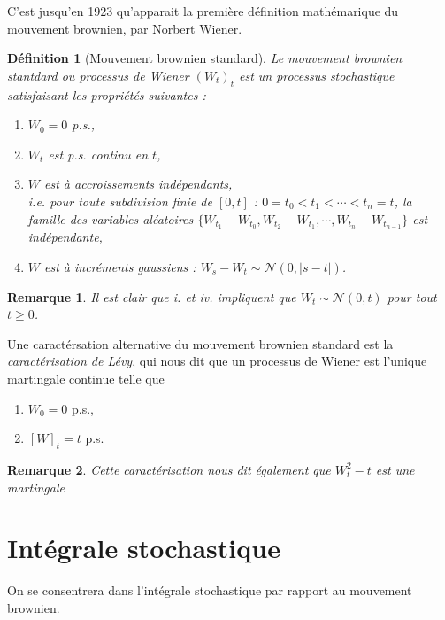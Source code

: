 \documentclass[openany]{book}
\newcommand{\1}{\mathbbm{1}}
\theoremstyle{thmfont}
\theoremstyle{deffont}
\newtheorem{definition}[definition]{Définition}
\theoremstyle{thmfont}
\theoremstyle{deffont}
\newtheorem*{remark}{Remarque}
\begin{document}
C'est jusqu'en 1923 qu'apparait la première définition mathémarique du mouvement brownien, par Norbert Wiener.\\

\begin{definition}[Mouvement brownien standard]  \label{def:MvtBorwnien}
  Le \textit{mouvement brownien stantdard} ou \textit{processus de Wiener} $(W_t)_t$ est un processus stochastique satisfaisant les propriétés suivantes :
  \begin{enumerate}
  \item $W_0 = 0$ p.s.,
  \item $W_t$ est p.s. continu en $t$,
  \item $W$ est à accroissements indépendants,\\
    i.e. pour toute subdivision finie de $[0,t]$ :  $0 = t_0 < t_1 < \cdots < t_n = t$, la famille des variables aléatoires
    $\{W_{t_1} - W_{t_0}, W_{t_2} - W_{t_1}, \cdots ,W_{t_n} - W_{t_{n-1}}\}$
    est indépendante,
  \item $W$ est à incréments gaussiens : $W_s - W_t \sim \mathcal{N}(0,|s-t|)$.
  \end{enumerate}
\end{definition}

\begin{remark}
  Il est clair que \textit{i.} et \textit{iv.} impliquent que $W_t \sim \mathcal{N}(0,t)$ pour tout $t \geq 0$.
\end{remark}


Une caractérsation alternative du mouvement brownien standard est la \textit{caractérisation de Lévy}, qui nous dit que un processus de Wiener est l'unique martingale continue telle que
\begin{enumerate}
\item $W_0 = 0$ p.s.,
\item $[W]_t = t$ p.s.
  \label{def:MvtBorwnien_caractLevy}
\end{enumerate}

\begin{remark}
  Cette caractérisation nous dit également que $W_t^2 - t$ est une martingale
\end{remark}

\section{Intégrale stochastique}  

On se consentrera dans l'intégrale stochastique par rapport au mouvement brownien. 
\end{document}
